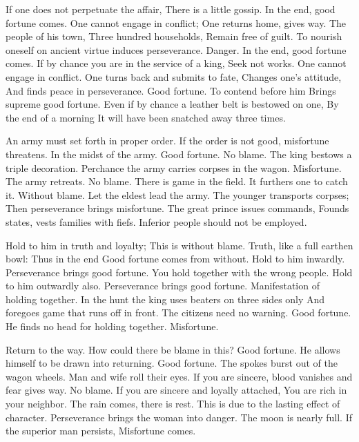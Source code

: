 {If one does not perpetuate the affair,
 There is a little gossip.
 In the end, good fortune comes.}
{One cannot engage in conflict;
 One returns home, gives way.
 The people of his town,
 Three hundred households,
 Remain free of guilt.}
{To nourish oneself on ancient virtue induces perseverance.
 Danger. In the end, good fortune comes.
 If by chance you are in the service of a king,
 Seek not works.}
{One cannot engage in conflict.
 One turns back and submits to fate,
 Changes one’s attitude,
 And finds peace in perseverance.
 Good fortune.}
{To contend before him
 Brings supreme good fortune.}
{Even if by chance a leather belt is bestowed on one,
 By the end of a morning
 It will have been snatched away three times.}

{An army must set forth in proper order.
 If the order is not good, misfortune threatens.}
{In the midst of the army.
 Good fortune. No blame.
 The king bestows a triple decoration.}
{Perchance the army carries corpses in the wagon.
 Misfortune.}
{The army retreats. No blame.}
{There is game in the field.
 It furthers one to catch it.
 Without blame.
 Let the eldest lead the army.
 The younger transports corpses;
 Then perseverance brings misfortune.}
{The great prince issues commands,
 Founds states, vests families with fiefs.
 Inferior people should not be employed.}

{Hold to him in truth and loyalty;
 This is without blame.
 Truth, like a full earthen bowl:
 Thus in the end
 Good fortune comes from without.}
{Hold to him inwardly.
 Perseverance brings good fortune.}
{You hold together with the wrong people.}
{Hold to him outwardly also.
 Perseverance brings good fortune.}
{Manifestation of holding together.
 In the hunt the king uses beaters on three sides only
 And foregoes game that runs off in front.
 The citizens need no warning.
 Good fortune.}
{He finds no head for holding together.
 Misfortune.}

{Return to the way.
 How could there be blame in this?
 Good fortune.}
{He allows himself to be drawn into returning.
 Good fortune.}
{The spokes burst out of the wagon wheels.
 Man and wife roll their eyes.}
{If you are sincere, blood vanishes and fear gives way.
 No blame.}
{If you are sincere and loyally attached,
 You are rich in your neighbor.}
{The rain comes, there is rest.
 This is due to the lasting effect of character.
 Perseverance brings the woman into danger.
 The moon is nearly full.
 If the superior man persists,
 Misfortune comes.}

